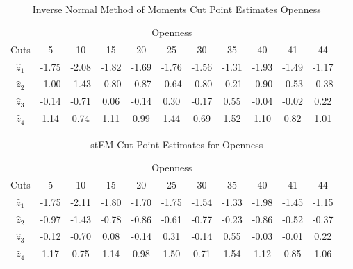 \documentclass[12pt]{article}
\begin{document}
\begin{table}[tbp]
\begin{center}
\begin{tabular}{|c||c|c|c|c|c|c|c|c|c|c|c|}
\hline
\multicolumn{11}{|c|}{Openness} &  \\ \cline{1-11}
Cuts & 5 & 10 & 15 & 20 & 25 & 30 & 35 & 40 & 41 & 44 &  \\ \cline{1-11}
$\hat{z}_1$ & -1.75 & -2.08 & -1.82 & -1.69 & -1.76 & -1.56 & -1.31 & -1.93
& -1.49 & -1.17 &  \\ \cline{1-11}
$\hat{z}_2$ & -1.00 & -1.43 & -0.80 & -0.87 & -0.64 & -0.80 & -0.21 & -0.90
& -0.53 & -0.38 &  \\ \cline{1-11}
$\hat{z}_3$ & -0.14 & -0.71 & 0.06 & -0.14 & 0.30 & -0.17 & 0.55 & -0.04 & 
-0.02 & 0.22 &  \\ \cline{1-11}
$\hat{z}_4$ & 1.14 & 0.74 & 1.11 & 0.99 & 1.44 & 0.69 & 1.52 & 1.10 & 0.82 & 
1.01 &  \\ \cline{1-11}
\end{tabular}%
\end{center}
\caption{Inverse Normal Method of Moments Cut Point Estimates Openness}
\label{ocuts}
\end{table}
\begin{table}[tbp]
\begin{center}
\begin{tabular}{|c||c|c|c|c|c|c|c|c|c|c|c|}
\hline
\multicolumn{11}{|c|}{Openness} &  \\ \cline{1-11}
Cuts & 5 & 10 & 15 & 20 & 25 & 30 & 35 & 40 & 41 & 44 &  \\ \cline{1-11}
$\hat{z}_1$ & -1.75 & -2.11 & -1.80 & -1.70 & -1.75 & -1.54 & -1.33 & -1.98
& -1.45 & -1.15 &  \\ \cline{1-11}
$\hat{z}_2$ & -0.97 & -1.43 & -0.78 & -0.86 & -0.61 & -0.77 & -0.23 & -0.86
& -0.52 & -0.37 &  \\ \cline{1-11}
$\hat{z}_3$ & -0.12 & -0.70 & 0.08 & -0.14 & 0.31 & -0.14 & 0.55 & -0.03 & 
-0.01 & 0.22 &  \\ \cline{1-11}
$\hat{z}_4$ & 1.17 & 0.75 & 1.14 & 0.98 & 1.50 & 0.71 & 1.54 & 1.12 & 0.85 & 
1.06 &  \\ \cline{1-11}
\end{tabular}%
\end{center}
\caption{stEM Cut Point Estimates for Openness}
\label{stemocuts}
\end{table}
\end{document}
